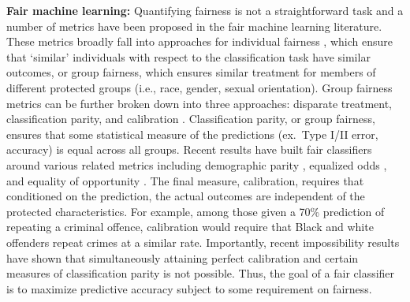 \documentclass[twoside,11pt]{article}
\begin{document}
\textbf{Fair machine learning: } Quantifying fairness is not a straightforward task and a number of metrics have been proposed in the fair machine learning literature. These metrics broadly fall into approaches for individual fairness \citep{dwork2011fairness}, which ensure that `similar' individuals with respect to the classification task have similar outcomes, or group fairness, which ensures similar treatment for members of different protected groups (i.e., race, gender, sexual orientation). Group fairness metrics can be further broken down into three approaches: disparate treatment, classification parity, and calibration \citep{corbettdavies2018measure}.  Classification parity, or group fairness, ensures that some statistical measure of the predictions (ex.~Type I/II error, accuracy) is equal across all groups. Recent results have built fair classifiers around various related metrics including demographic parity \citep{agarwal2018reductions, calders2010, dwork2011fairness, edwards2015censoring, kamiran2012,kamishima2012fairness,zafar2015fairness,celis2019classification}, equalized odds \citep{agarwal2018reductions, hardt2016equality, Zafar_2017,celis2019classification}, and equality of opportunity \citep{hardt2016equality, Zafar_2017,donini2018empirical}. The final measure, calibration, requires that conditioned on the prediction, the actual outcomes are independent of the protected characteristics. For example, among those given a 70\% prediction of repeating a criminal offence, calibration would require that Black and white offenders repeat crimes at a similar rate. Importantly, recent impossibility results  \citep{Chouldechova_2017, kleinberg2016inherent} have shown that simultaneously attaining  perfect calibration and certain measures of classification parity is not possible. Thus, the goal of a fair classifier is to maximize predictive accuracy subject to some requirement on fairness. 

\end{document}

